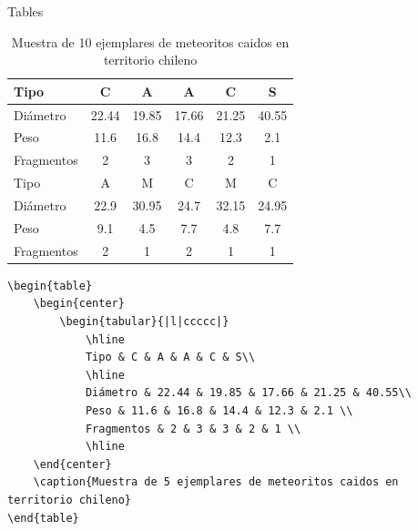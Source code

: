 \documentclass[../slides.tex]{subfiles}
\begin{document}
    \begin{frame}[fragile]{Tables}
    \scriptsize{
        \begin{table}
            \begin{center}
                \begin{tabular}{|l|ccccc|}
                    \hline
                    Tipo & C & A & A & C & S\\
                    \hline
                    Diámetro & 22.44 & 19.85 & 17.66 & 21.25 & 40.55\\
                    Peso & 11.6 & 16.8 & 14.4 & 12.3 & 2.1 \\
                    Fragmentos & 2 & 3 & 3 & 2 & 1 \\
                    \hline
                    \hline
                    Tipo & A & M & C & M & C\\
                    \hline
                    Diámetro & 22.9 & 30.95 & 24.7 & 32.15 & 24.95 \\
                    Peso & 9.1 & 4.5 & 7.7 & 4.8 & 7.7 \\
                    Fragmentos & 2 & 1 & 2 & 1 & 1 \\
                    \hline
                \end{tabular}
            \end{center}
            \caption{Muestra de 10 ejemplares de meteoritos caidos en territorio chileno}
        \end{table}
    \begin{verbatim}
\begin{table}
    \begin{center}
        \begin{tabular}{|l|ccccc|}
            \hline
            Tipo & C & A & A & C & S\\
            \hline
            Diámetro & 22.44 & 19.85 & 17.66 & 21.25 & 40.55\\
            Peso & 11.6 & 16.8 & 14.4 & 12.3 & 2.1 \\
            Fragmentos & 2 & 3 & 3 & 2 & 1 \\
            \hline
    \end{center}
    \caption{Muestra de 5 ejemplares de meteoritos caidos en territorio chileno}
\end{table}
    \end{verbatim}}
    \end{frame}
    
\end{document}
